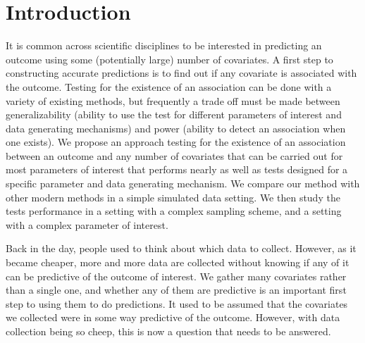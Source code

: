 \documentclass{article}
\author{Adam Elder}
\newcommand{\sh}{\textcolor{red}}
\begin{document}
 \section{Introduction}
\doublespacing

It is common across scientific disciplines to be interested in predicting an outcome using some (potentially large) number of covariates.  A first step to constructing accurate predictions is to find out if any covariate is associated with the outcome. Testing for the existence of an association can be done with a variety of existing methods, but frequently a trade off must be made between generalizability (ability to use the test for different parameters of interest and data generating mechanisms) and power (ability to detect an association when one exists).  We propose an approach testing for the existence of an association between an outcome and any number of covariates that can be carried out for most parameters of interest that performs nearly as well as tests designed for a specific parameter and data generating mechanism.  We compare our method with other modern methods in a simple simulated data setting.  We then study the tests performance in a setting with a complex sampling scheme, and a setting with a complex parameter of interest.  

Back in the day, people used to think about which data to collect.  However, as it became cheaper, more and more data are collected without knowing if any of it can be predictive of the outcome of interest.  We gather many covariates rather than a single one, and whether any of them are predictive is an important first step to using them to do predictions.  It used to be assumed that the covariates we collected were in some way predictive of the outcome.  However, with data collection being so cheep, this is now a question that needs to be answered.


\end{document}
